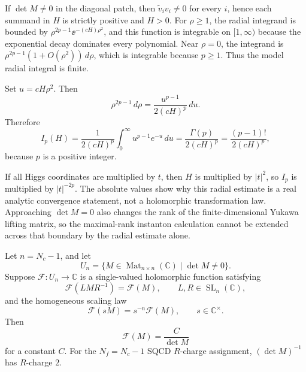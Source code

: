 If \(\det M\neq0\) in the diagonal patch, then
\(\widetilde v_i v_i\neq0\) for every \(i\), hence each summand in \(H\) is
strictly positive and \(H>0\).  For \(\rho\ge1\), the radial integrand is
bounded by \(\rho^{2p-1}\ee^{-(cH)\rho^2}\), and this function is integrable
on \([1,\infty)\) because the exponential decay dominates every polynomial.
Near \(\rho=0\), the integrand is \(\rho^{2p-1}(1+O(\rho^2))\,d\rho\), which
is integrable because \(p\ge1\).  Thus the model radial integral is finite.

Set \(u=cH\rho^2\).  Then
\[
  \rho^{2p-1}\,d\rho
  =
  \frac{u^{p-1}}{2(cH)^p}\,du .
\]
Therefore
\[
  I_p(H)
  =
  \frac{1}{2(cH)^p}
  \int_0^\infty u^{p-1}e^{-u}\,du
  =
  \frac{\Gamma(p)}{2(cH)^p}
  =
  \frac{(p-1)!}{2(cH)^p},
\]
because \(p\) is a positive integer.

If all Higgs coordinates are multiplied by \(t\), then \(H\) is multiplied by
\(|t|^2\), so \(I_p\) is multiplied by \(|t|^{-2p}\).  The absolute values
show why this radial estimate is a real analytic convergence statement, not
a holomorphic transformation law.  Approaching \(\det M=0\) also changes the
rank of the finite-dimensional Yukawa lifting matrix, so the maximal-rank
instanton calculation cannot be extended across that boundary by the radial
estimate alone.

\begin{lemma}
\label{lem:ads-maximal-rank-meson-invariant}
Let \(n=N_c-1\), and let
\[
  U_n=\{M\in \operatorname{Mat}_{n\times n}(\mathbb C)\mid \det M\neq0\}.
\]
Suppose \(\mathcal F:U_n\to\mathbb C\) is a single-valued holomorphic
function satisfying
\begin{equation}
  \mathcal F(LMR^{-1})=\mathcal F(M),
  \qquad L,R\in \operatorname{SL}_n(\mathbb C),
  \label{eq:ads-special-flavor-invariance}
\end{equation}
and the homogeneous scaling law
\begin{equation}
  \mathcal F(sM)=s^{-n}\mathcal F(M),
  \qquad s\in\mathbb C^\times .
  \label{eq:ads-reduced-factor-homogeneity}
\end{equation}
Then
\[
  \mathcal F(M)=\frac{C}{\det M}
\]
for a constant \(C\).  For the \(N_f=N_c-1\) SQCD \(R\)-charge assignment,
\((\det M)^{-1}\) has \(R\)-charge \(2\).
\end{lemma}

